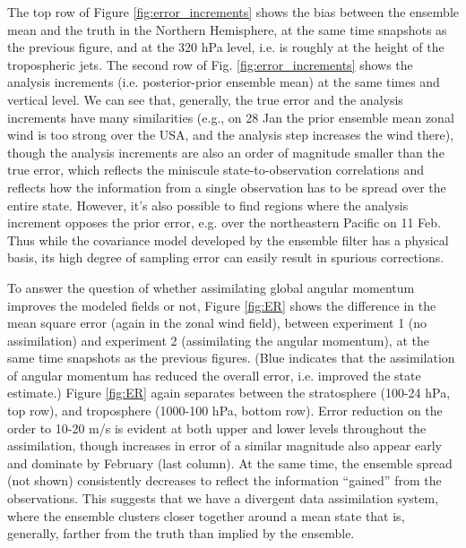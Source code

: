 The top row of Figure \ref{fig:error_increments} shows the bias between the ensemble mean and the truth in the Northern Hemisphere, at the same time snapshots as the previous figure, and at the 320 hPa level, i.e. is roughly at the height of the tropospheric jets. 
The second row of Fig. \ref{fig:error_increments} shows the analysis increments (i.e. posterior-prior ensemble mean) at the same times and vertical level. 
We can see that, generally, the true error and the analysis increments have many similarities (e.g., on 28 Jan the prior ensemble mean zonal wind is too strong over the USA, and the analysis step increases the wind there), though 
the analysis increments are also an order of magnitude smaller than the true error, which reflects the miniscule state-to-observation correlations and reflects how the information from a single observation has to be spread over the entire state. 
However, it's also possible to find regions where the analysis increment opposes the prior error, e.g. over the northeastern Pacific on 11 Feb. 
Thus while the covariance model developed by the ensemble filter has a physical basis, its high degree of sampling error can easily result in spurious corrections. 

To answer the question of whether assimilating global angular momentum improves the modeled fields or not, 
Figure \ref{fig:ER} shows the difference in the mean square error (again in the zonal wind field), between experiment 1 (no assimilation) and experiment 2 (assimilating the angular momentum), at the same time snapshots as the previous figures. 
(Blue indicates that the assimilation of angular momentum has reduced the overall error, i.e. improved the state estimate.)
Figure \ref{fig:ER} again separates between the stratosphere (100-24 hPa, top row), and troposphere (1000-100 hPa, bottom row). 
Error reduction on the order to 10-20 m/s is evident at both upper and lower levels throughout the assimilation, though increases in error of a similar magnitude also appear early and dominate by February (last column).  
At the same time, the ensemble spread (not shown) consistently decreases to reflect the information ``gained'' from the observations. 
This suggests that we have a divergent data assimilation system, where the ensemble clusters closer together around a mean state that is, generally, farther from the truth than implied by the ensemble. 

